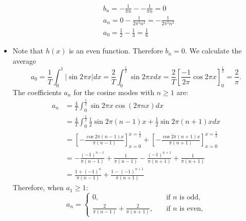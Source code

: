 \documentclass[11pt]{article}
\begin{document}
\begin{solution}
\begin{itemize}
\begin{align*}
                    &b_n = -\frac{1}{\pi n} - - \frac{1}{\pi n} = 0
                    \\& 
            a_n = 0 - \frac{1}{2\pi^2 n^2} =  - \frac{1}{2\pi^2 n^2} 
                    \\&
            a_0 = \frac{1}{2} - \frac{1}{3} = \frac{1}{6}
        \end{align*}	
        \item
        Note that $h(x)$ is an even function.
        Therefore $b_n = 0$. 
        We calculate the average 
        \[
            a_0 
            = 
            \frac{1}{T} \int_{0}^{1} |\sin 2\pi x| dx  
            = 
            \frac{2}{T} \int_{0}^{\frac 1 2} \sin 2\pi x dx  
            =  
            \frac 2 T
            \left[ \frac{-1}{2\pi} \cos{2\pi x} \right]_{0}^{\frac 1 2} 
            =
            \frac{2}{\pi} 
            .
        \]
        The coefficients $a_n$ for the cosine modes with $n \geq 1$ are:
        \begin{align*}
            a_n 
            &
            = 
            \frac{4}{T}
            \int_{0}^{\frac 1 2} \sin 2\pi x \cos(2\pi n x) dx
            \\&
            =
            \frac{4}{T}
            \int_{0}^{\frac 1 2} \frac 1 2 \sin{2\pi(n-1)x} + \frac 1 2 \sin{2\pi(n+1)x} dx
            \\&
            =
            \left[- \frac{ \cos2\pi(n-1)x }{ \pi(n-1) } \right]_{x=0}^{x=\frac 1 2}
            +
            \left[- \frac{ \cos2\pi(n+1)x }{ \pi(n+1) } \right]_{x=0}^{x=\frac 1 2}
            \\&
            = 
            -\frac{(-1)^{n-1}}{\pi(n-1)} +  \frac{1}{\pi(n-1)}  - \frac{(-1)^{n+1}}{\pi(n+1)} + \frac{1}{\pi(n+1)}
            \\&
            = \frac{1+(-1)^{n}}{\pi(n-1)} +  \frac{1-(-1)^{n+1}}{\pi(n+1)} 
        \end{align*}	
        Therefore, when $a_1 \geq 1$:
        \[a_n = 
        \begin{cases}
        0 ,\quad &\text{if } n\text{ is odd,}\\
        \frac{2}{\pi(n-1)} + \frac{2}{\pi(n+1)}  ,\quad &\text{if } n\text{ is even,}
        \end{cases}
        \]
       \end{itemize}
\end{solution}
\end{document}
